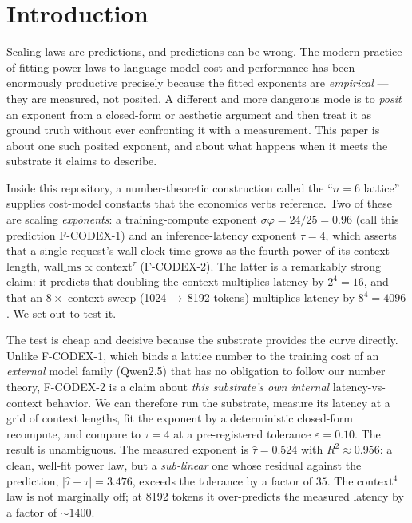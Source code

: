 \documentclass[11pt,a4paper]{article}
\newcommand{\taum}{\ensuremath{\hat{\tau}}}
\begin{document}
\section{Introduction}
\label{sec:intro}

Scaling laws are predictions, and predictions can be wrong. The modern practice
of fitting power laws to language-model cost and performance
\citep{kaplan2020scaling,hoffmann2022chinchilla} has been enormously productive
precisely because the fitted exponents are \emph{empirical} --- they are
measured, not posited. A different and more dangerous mode is to \emph{posit} an
exponent from a closed-form or aesthetic argument and then treat it as ground
truth without ever confronting it with a measurement. This paper is about one
such posited exponent, and about what happens when it meets the substrate it
claims to describe.

Inside this repository, a number-theoretic construction called the
``\(n{=}6\) lattice'' supplies cost-model constants that the economics verbs
reference. Two of these are scaling \emph{exponents}: a training-compute
exponent \(\sigma\varphi = 24/25 = 0.96\) (call this prediction F-CODEX-1) and
an inference-latency exponent \(\tau = 4\), which asserts that a single
request's wall-clock time grows as the fourth power of its context length,
\(\mathrm{wall\_ms} \propto \mathrm{context}^{\tau}\) (F-CODEX-2). The latter is
a remarkably strong claim: it predicts that doubling the context multiplies
latency by \(2^4 = 16\), and that an \(8\times\) context sweep
(\num{1024}\,\(\to\)\,\num{8192} tokens) multiplies latency by
\(8^4 = 4096\). We set out to test it.

The test is cheap and decisive because the substrate provides the curve
directly. Unlike F-CODEX-1, which binds a lattice number to the training cost of
an \emph{external} model family (Qwen2.5) that has no obligation to follow our
number theory, F-CODEX-2 is a claim about \emph{this substrate's own internal}
latency-vs-context behavior. We can therefore run the substrate, measure its
latency at a grid of context lengths, fit the exponent by a deterministic
closed-form recompute, and compare to \(\tau = 4\) at a pre-registered tolerance
\(\varepsilon = 0.10\). The result is unambiguous. The measured exponent is
\(\taum = 0.524\) with \(R^2 \approx 0.956\): a clean, well-fit power law, but a
\emph{sub-linear} one whose residual against the prediction,
\(|\taum - \tau| = 3.476\), exceeds the tolerance by a factor of \(35\). The
\(\mathrm{context}^4\) law is not marginally off; at \num{8192} tokens it
over-predicts the measured latency by a factor of \(\sim\!1400\).
\end{document}
